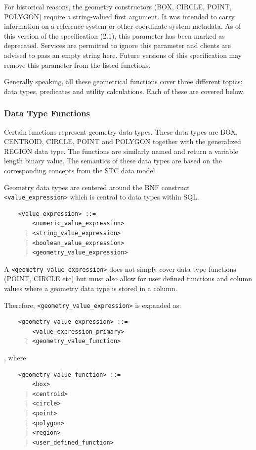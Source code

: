 \documentclass[11pt,a4paper]{ivoa}
\begin{document}
For historical reasons, the geometry constructors (BOX, CIRCLE, POINT,
POLYGON) require a string-valued first argument. It was intended to carry
information on a reference system or other coordinate system metadata.
As of this version of the specification (2.1), this parameter has been
marked as deprecated. Services are permitted to ignore this parameter and
clients are advised to pass an empty string here. Future versions of this
specification may remove this parameter from the listed functions.

Generally speaking, all these geometrical functions cover three different
topics: data types, predicates and utility calculations. Each of these are
covered below.

\subsubsection{Data Type Functions}
\label{sec:geom.functions.type}

Certain functions represent geometry data types. These data types are BOX,
CENTROID, CIRCLE, POINT and POLYGON together with the generalized REGION data
type. The functions are similarly named and return a variable length binary
value. The semantics of these data types are based on the corresponding
concepts from the STC data model.

Geometry data types are centered around the BNF construct
\verb:<value_expression>: which is central to data types within SQL.

\begin{verbatim}
    <value_expression> ::=
        <numeric_value_expression>
      | <string_value_expression>
      | <boolean_value_expression>
      | <geometry_value_expression>
\end{verbatim}

A \verb:<geometry_value_expression>: does not simply cover data type functions
(POINT, CIRCLE etc) but must also allow for user defined functions and
column values where a geometry data type is stored in a column.

Therefore, \verb:<geometry_value_expression>: is expanded as:

\begin{verbatim}
    <geometry_value_expression> ::= 
        <value_expression_primary>
      | <geometry_value_function>
\end{verbatim}

, where

\begin{verbatim}
    <geometry_value_function> ::=
        <box>
      | <centroid>
      | <circle>
      | <point>
      | <polygon>
      | <region>
      | <user_defined_function>
\end{verbatim}
\end{document}
